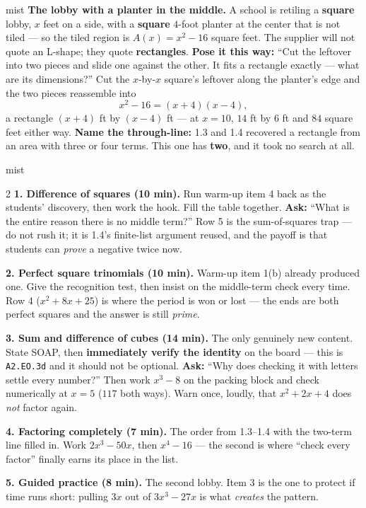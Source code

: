 \documentclass[10pt]{article}
\begin{document}
\begin{skillbox}[Hook]{mist}
\textbf{The lobby with a planter in the middle.} A school is retiling a \textbf{square} lobby, $x$
feet on a side, with a \textbf{square} $4$-foot planter at the center that is not tiled --- so the
tiled region is $A(x)=x^2-16$ square feet. The supplier will not quote an L-shape; they quote
\textbf{rectangles}. \textbf{Pose it this way:} ``Cut the leftover into two pieces and slide one
against the other. It fits a rectangle exactly --- what are its dimensions?'' Cut the $x$-by-$x$
square's leftover along the planter's edge and the two pieces reassemble into
\[ x^2-16 = (x+4)(x-4), \]
a rectangle $(x+4)$ ft by $(x-4)$ ft --- at $x=10$, $14$ ft by $6$ ft and $84$ square feet either
way. \textbf{Name the through-line:} 1.3 and 1.4 recovered a rectangle from an area with three or
four terms. This one has \textbf{two}, and it took no search at all.
\end{skillbox}

\boxguard
\begin{skillbox}[Lesson]{mist}
\begin{multicols}{2}
\textbf{1. Difference of squares (10 min).} Run warm-up item 4 back as the students' discovery, then
work the hook. Fill the table together. \textbf{Ask:} ``What is the entire reason there is no middle
term?'' Row 5 is the sum-of-squares trap --- do not rush it; it is 1.4's finite-list argument
reused, and the payoff is that students can \emph{prove} a negative twice now.

\textbf{2. Perfect square trinomials (10 min).} Warm-up item 1(b) already produced one. Give the
recognition test, then insist on the middle-term check every time. Row 4 ($x^2+8x+25$) is where the
period is won or lost --- the ends are both perfect squares and the answer is still \emph{prime}.

\textbf{3. Sum and difference of cubes (14 min).} The only genuinely new content. State SOAP, then
\textbf{immediately verify the identity} on the board --- this is \texttt{A2.EO.3d} and it should
not be optional. \textbf{Ask:} ``Why does checking it with letters settle every number?'' Then work
$x^3-8$ on the packing block and check numerically at $x=5$ ($117$ both ways). Warn once, loudly,
that $x^2+2x+4$ does \emph{not} factor again.

\textbf{4. Factoring completely (7 min).} The order from 1.3--1.4 with the two-term line filled in.
Work $2x^3-50x$, then $x^4-16$ --- the second is where ``check every factor'' finally earns its
place in the list.

\textbf{5. Guided practice (8 min).} The second lobby. Item 3 is the one to protect if time runs
short: pulling $3x$ out of $3x^3-27x$ is what \emph{creates} the pattern.
\end{multicols}
\end{skillbox}
\end{document}
